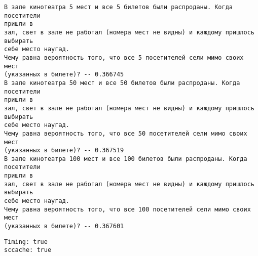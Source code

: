 \documentclass[11pt]{article}
\makeatletter
\newcommand{\boxspacing}{\kern\kvtcb@left@rule\kern\kvtcb@boxsep}
\newcommand{\prompt}[4]{
        {\ttfamily\llap{{\color{#2}[#3]:\hspace{3pt}#4}}\vspace{-\baselineskip}}
    }
\makeatother
\begin{document}
    \begin{Verbatim}[commandchars=\\\{\}]
В зале кинотеатра 5 мест и все 5 билетов были распроданы. Когда посетители
пришли в
зал, свет в зале не работал (номера мест не видны) и каждому пришлось выбирать
себе место наугад.
Чему равна вероятность того, что все 5 посетителей сели мимо своих мест
(указанных в билете)? -- 0.366745
В зале кинотеатра 50 мест и все 50 билетов были распроданы. Когда посетители
пришли в
зал, свет в зале не работал (номера мест не видны) и каждому пришлось выбирать
себе место наугад.
Чему равна вероятность того, что все 50 посетителей сели мимо своих мест
(указанных в билете)? -- 0.367519
В зале кинотеатра 100 мест и все 100 билетов были распроданы. Когда посетители
пришли в
зал, свет в зале не работал (номера мест не видны) и каждому пришлось выбирать
себе место наугад.
Чему равна вероятность того, что все 100 посетителей сели мимо своих мест
(указанных в билете)? -- 0.367601
    \end{Verbatim}

            \begin{tcolorbox}[breakable, size=fbox, boxrule=.5pt, pad at break*=1mm, opacityfill=0]
\prompt{Out}{outcolor}{12}{\boxspacing}
\begin{Verbatim}[commandchars=\\\{\}]
Timing: true
sccache: true

\end{Verbatim}
\end{tcolorbox}
        
\end{document}
